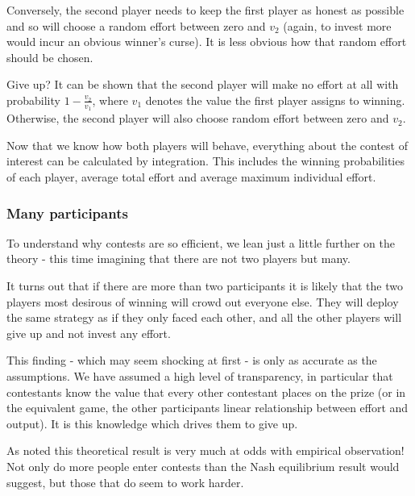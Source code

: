 Conversely, the second player needs to keep the first player as honest as possible and so will choose a random effort between zero and $v_2$ (again, to invest more would incur an obvious winner's curse). It is less obvious how that random effort should be chosen. 

Give up? It can be shown that the second player will make no effort at all with probability $1-\frac{v_2}{v_1}$, where $v_1$ denotes the value the first player assigns to winning. Otherwise, the second player will also choose random effort between zero and $v_2$. 

Now that we know how both players will behave, everything about the contest of interest can be calculated by integration. This includes the winning probabilities of each player, average total effort and average maximum individual effort. 


\subsubsection{Many participants}

To understand why contests are so efficient, we lean just a little further on the theory - this time imagining that there are not two players but many. 

It turns out that if there are more than two participants it is likely that the two players most desirous of winning will crowd out everyone else. They will deploy the same strategy as if they only faced each other, and all the other players will give up and not invest any effort. 

This finding - which may seem shocking at first - is only as accurate as the assumptions. We have assumed a high level of transparency, in particular that contestants know the value that every other contestant places on the prize (or in the equivalent game, the other participants linear relationship between effort and output). It is this knowledge which drives them to give up. 

As noted this theoretical result is very much at odds with empirical observation! Not only do more people enter contests than the Nash equilibrium result would suggest, but those that do seem to work harder. 

